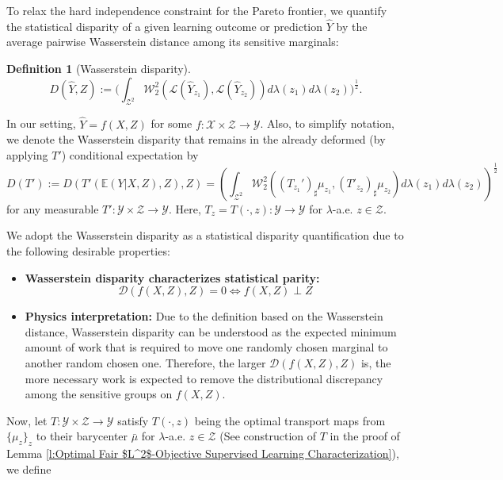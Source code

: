 \documentclass[twoside,11pt]{article}
\newtheorem{defi}{Definition}[section]{\bfseries}{\itshape}
\begin{document}
To relax the hard independence constraint for the Pareto frontier, we quantify the statistical disparity of a given learning outcome or prediction $\hat{Y}$ by the average pairwise Wasserstein distance among its sensitive marginals:
\begin{defi}[Wasserstein disparity] \label{d:wasserstein disparity}
\begin{equation}
D(\hat{Y},Z) := \Big(\int_{\mathcal{Z}^2} \mathcal{W}_2^2(\mathcal{L}(\hat{Y}_{z_1}), \mathcal{L}(\hat{Y}_{z_2})) d\lambda({z_1})d\lambda({z_2})\Big)^{\frac{1}{2}}.
\end{equation}
\end{defi}
In our setting, $\hat{Y} = f(X,Z)$ for some $f: \mathcal{X} \times \mathcal{Z} \rightarrow \mathcal{Y}$. Also, to simplify notation, we denote the Wasserstein disparity that remains in the already deformed (by applying $T'$) conditional expectation by
\begin{equation} \label{d:remaining disparity (D)}
D(T') := D(T'(\mathbb{E}(Y|X,Z),Z),Z) = (\int_{\mathcal{Z}^2} \mathcal{W}_2^2((T_{z_1}')_{\sharp}\mu_{z_1},(T'_{z_2})_{\sharp}\mu_{z_2}) d\lambda({z_1})d\lambda({z_2}))^{\frac{1}{2}}
\end{equation}
for any measurable $T': \mathcal{Y} \times \mathcal{Z} \rightarrow \mathcal{Y}$. Here, $T_z = T(\cdot,z): \mathcal{Y} \rightarrow \mathcal{Y}$ for $\lambda$-a.e. $z \in \mathcal{Z}$.

We adopt the Wasserstein disparity as a statistical disparity quantification due to the following desirable properties:
\begin{itemize}
\item \textbf{Wasserstein disparity characterizes statistical parity:} $$\mathcal{D}(f(X,Z),Z) =0 \iff f(X,Z) \perp Z$$
\item \textbf{Physics interpretation:} Due to the definition based on the Wasserstein distance, Wasserstein disparity can be understood as the expected minimum amount of work that is required to move one randomly chosen marginal to another random chosen one. Therefore, the larger $\mathcal{D}(f(X,Z),Z)$ is, the more necessary work is expected to remove the distributional discrepancy among the sensitive groups on $f(X,Z)$.
\end{itemize}

Now, let $T: \mathcal{Y} \times \mathcal{Z} \rightarrow \mathcal{Y}$ satisfy $T(\cdot,z)$ being the optimal transport maps from $\{\mu_z\}_z$ to their barycenter $\bar{\mu}$ for $\lambda$-a.e. $z \in \mathcal{Z}$ (See construction of $T$ in the proof of Lemma \ref{l:Optimal Fair $L^2$-Objective Supervised Learning Characterization}), we define
\end{document}
